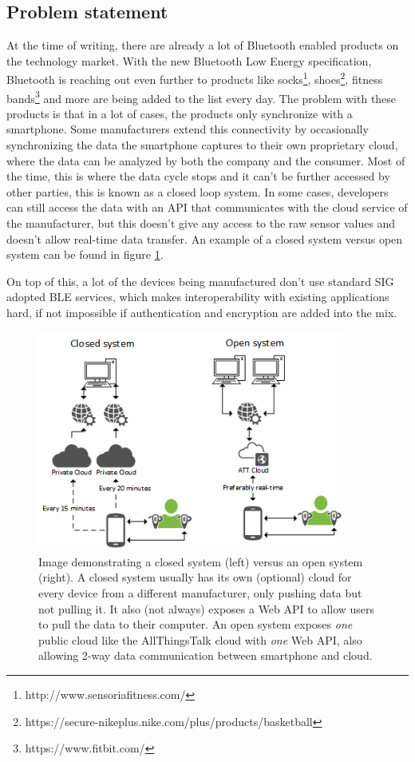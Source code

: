 \documentclass[pdftex,a4paper,12pt,twoside]{report}
\begin{document}
\subsection{Problem statement}
\label{subsec:problemstatement}
At the time of writing, there are already a lot of Bluetooth enabled products on the technology market. With the new Bluetooth Low Energy specification, Bluetooth is reaching out even further to products like socks\footnote{http://www.sensoriafitness.com/}, shoes\footnote{https://secure-nikeplus.nike.com/plus/products/basketball}, fitness bands\footnote{https://www.fitbit.com/} and more are being added to the list every day. The problem with these products is that in a lot of cases, the products only synchronize with a smartphone. Some manufacturers extend this connectivity by occasionally synchronizing the data the smartphone captures to their own proprietary cloud, where the data can be analyzed by both the company and the consumer. Most of the time, this is where the data cycle stops and it can't be further accessed by other parties, this is known as a closed loop system. In some cases, developers can still access the data with an API that communicates with the cloud service of the manufacturer, but this doesn't give any access to the raw sensor values and doesn't allow real-time data transfer. An example of a closed system versus open system can be found in figure \ref{fig:networkloops}.

On top of this, a lot of the devices being manufactured don't use standard SIG adopted BLE services, which makes interoperability with existing applications hard, if not impossible if authentication and encryption are added into the mix.

\begin{figure}[h]
    \centering
    \includegraphics[width=0.9\textwidth]{img/networkloop.png}
    \caption[Image demonstrating a closed cloud system versus an open cloud system]{Image demonstrating a closed system (left) versus an open system (right). A closed system usually has its own (optional) cloud for every device from a different manufacturer, only pushing data but not pulling it. It also (not always) exposes a Web API to allow users to pull the data to their computer. An open system exposes \textit{one} public cloud like the AllThingsTalk cloud with \textit{one} Web API, also allowing 2-way data communication between smartphone and cloud.}
    \label{fig:networkloops}
\end{figure}
\end{document}
